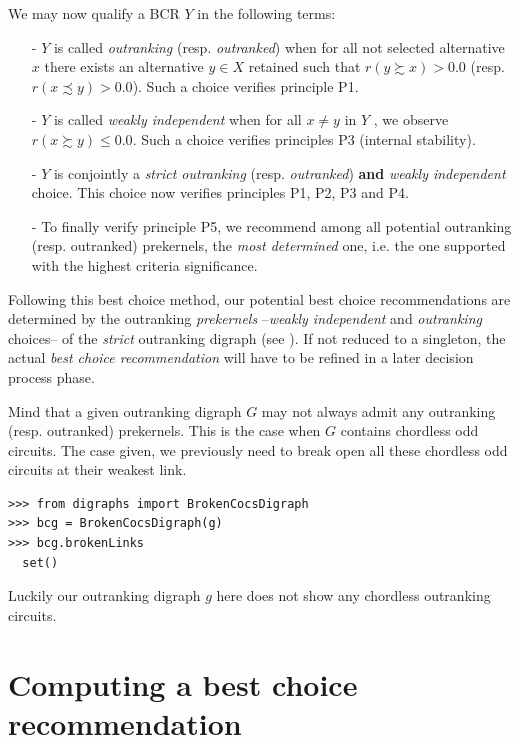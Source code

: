 We may now qualify a BCR $Y$ in the following terms:
\begin{itemize}[leftmargin=0.5cm,listparindent=0em]
\item [-] $Y$ is called \emph{outranking} (resp. \emph{outranked}) when for all not selected alternative $x$ there exists an alternative $y \in X$ retained such that $r(y \succsim x) > 0.0$ (resp. $r(x \precsim y) > 0.0$). Such a choice verifies principle P1.
\item [-] $Y$ is called \emph{weakly independent} when for all $x \neq y$ in $Y$ , we observe $r(x \succsim y) \leq 0.0$. Such a choice verifies principles P3 (internal stability).
\item [-] $Y$ is conjointly a \emph{strict  outranking} (resp. \emph{outranked}) \textbf{and} \emph{weakly independent} choice. This choice now verifies principles P1, P2, P3 and P4.
\item [-] To finally verify principle P5, we recommend among all potential outranking (resp. outranked) prekernels, the \emph{most determined} one, i.e. the one supported with the highest criteria significance.
\end{itemize}

Following this best choice method, our potential best choice recommendations are determined by the outranking \emph{prekernels} --\emph{weakly independent} and \emph{outranking} choices-- of the \emph{strict} outranking digraph (see \citet{BIS-2008a}). If not reduced to a singleton, the actual \emph{best choice recommendation} will have to be refined in a later decision process phase.

Mind that a given outranking digraph $G$ may not always admit any outranking (resp. outranked) prekernels. This is the case when $G$ contains chordless odd circuits. The case given, we previously need to break open all these chordless odd circuits at their weakest link.
\begin{lstlisting}
>>> from digraphs import BrokenCocsDigraph
>>> bcg = BrokenCocsDigraph(g)
>>> bcg.brokenLinks
  set()
\end{lstlisting}
Luckily our outranking digraph $g$ here does not show any chordless outranking circuits.

\section{Computing a best choice recommendation}
\label{sec:4.4}

